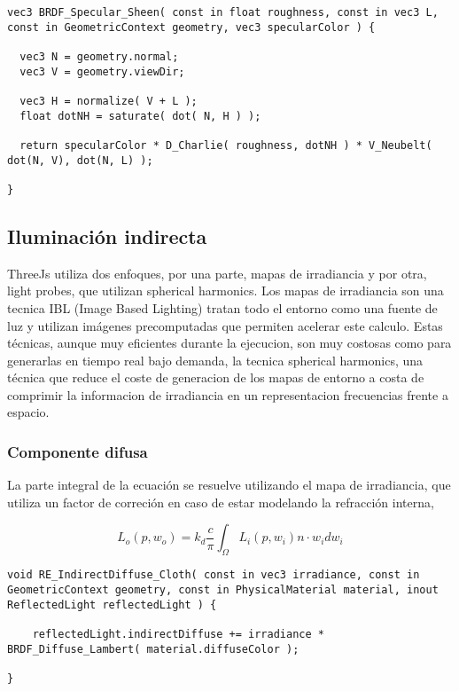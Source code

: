   \singlespacing
  \begin{lstlisting}[caption=Cambios sobre la clase WebGLPrograms de ThreeJs]
vec3 BRDF_Specular_Sheen( const in float roughness, const in vec3 L, const in GeometricContext geometry, vec3 specularColor ) {

  vec3 N = geometry.normal;
  vec3 V = geometry.viewDir;

  vec3 H = normalize( V + L );
  float dotNH = saturate( dot( N, H ) );

  return specularColor * D_Charlie( roughness, dotNH ) * V_Neubelt( dot(N, V), dot(N, L) );

}
  \end{lstlisting}

  \subsection{Iluminaci\'on indirecta}
    ThreeJs utiliza dos enfoques, por una parte, mapas de irradiancia y por otra, light probes, que
    utilizan spherical harmonics. Los mapas de irradiancia son una tecnica IBL (Image Based Lighting)
    tratan todo el entorno como una fuente de luz y utilizan im\'agenes precomputadas que permiten
    acelerar este calculo. Estas t\'ecnicas, aunque muy eficientes durante la ejecucion, son muy
    costosas como para generarlas en tiempo real bajo demanda, la tecnica spherical harmonics, una
    t\'ecnica que reduce el coste de generacion de los mapas de entorno a costa de comprimir la
    informacion de irradiancia en un representacion frecuencias frente a espacio.

    \subsubsection{Componente difusa}
      La parte integral de la ecuaci\'on se resuelve utilizando el mapa de irradiancia,
      que utiliza un factor de correci\'on en caso de estar modelando la refracci\'on interna,

      $$
      L_o(p, w_o) = k_d \frac{c}{\pi} \int_{\Omega}{L_i(p, w_i) n\cdot{w_i}dw_i}{}
      $$

      \begin{lstlisting}
void RE_IndirectDiffuse_Cloth( const in vec3 irradiance, const in GeometricContext geometry, const in PhysicalMaterial material, inout ReflectedLight reflectedLight ) {

    reflectedLight.indirectDiffuse += irradiance * BRDF_Diffuse_Lambert( material.diffuseColor );

}
      \end{lstlisting}

